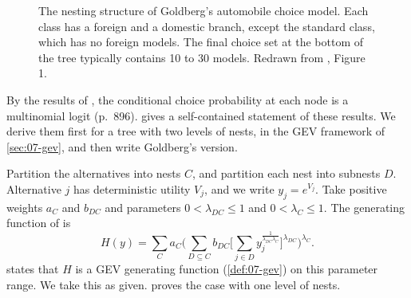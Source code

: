 \begin{figure}[htbp]
\centering
{}
\caption{The nesting structure of Goldberg's automobile choice model. Each class has a foreign and a domestic
branch, except the standard class, which has no foreign models. The final choice set at the bottom of the tree
typically contains 10 to 30 models. Redrawn from \citet{Goldberg1995}, Figure 1.}
\label{fig:08-gold-tree}
\end{figure}

By the results of \citet{McFadden1978,McFadden1981}, the conditional choice probability at each node is a
multinomial logit (p.~896). \citet[pp.~1421--1425]{McFadden1984} gives a self-contained statement of these
results. We derive them first for a tree with two levels of nests, in the GEV framework of \cref{sec:07-gev}, and
then write Goldberg's version.

 Partition the alternatives into nests $C$, and partition each nest into
subnests $D$. Alternative $j$ has deterministic utility $V_j$, and we write $y_j = e^{V_j}$. Take positive weights
$a_C$ and $b_{DC}$ and parameters $0 < \lambda_{DC} \leq 1$ and $0 < \lambda_C \leq 1$. The generating function of
\citet[eq.~3.33]{McFadden1984} is
\begin{equation}\label{eq:08-gold-H}
H(y) = \sum_C a_C\Big(\sum_{D \subseteq C} b_{DC}\Big[\sum_{j \in D} y_j^{\frac{1}{\lambda_{DC}\lambda_C}}
\Big]^{\lambda_{DC}}\Big)^{\lambda_C} .
\end{equation}
\citet[p.~1421]{McFadden1984} states that $H$ is a GEV generating function (\cref{def:07-gev}) on this parameter
range. We take this as given.  proves the case with one level of nests.

